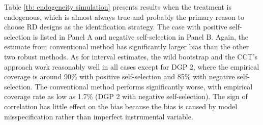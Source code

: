 \documentclass[12pt,]{article}
\DeclareMathOperator{\1}{\mathbbm{1}}
\begin{document}
Table \ref{tb: endogeneity simulation} presents results when the treatment is endogenous, which is almost always true and probably the primary reason to choose RD designs as the identification strategy. The case with positive self-selection is listed in Panel A and negative self-selection in Panel B. Again, the estimate from conventional method has significantly larger bias than the other two robust methods. As for interval estimates, the wild bootstrap and the CCT's approach work reasonably well in all cases except for DGP 2, where the empirical coverage is around 90\% with positive self-selection and 85\% with negative self-selection. The conventional method performs significantly worse, with empirical coverage rate as low as 1.7\% (DGP 2 with negative self-selection). The sign of correlation has little effect on the bias because the bias is caused by model misspecification rather than imperfect instrumental variable.
\end{document}
